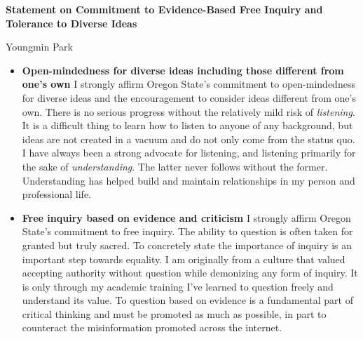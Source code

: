 \documentclass[a4paper,11pt]{article}
\begin{document}
	
	\begin{center}
		\Large \textbf{Statement on Commitment to Evidence-Based Free Inquiry and Tolerance to Diverse Ideas}
		
		\Large Youngmin Park
	\end{center}
	
	\begin{itemize}
		\item \textbf{Open-mindedness for diverse ideas including those different from one's own}
		I strongly affirm Oregon State's commitment to open-mindedness for diverse ideas and the encouragement to consider ideas different from one's own. There is no serious progress without the relatively mild risk of \textit{listening}. It is a difficult thing to learn how to listen to anyone of any background, but ideas are not created in a vacuum and do not only come from the status quo. I have always been a strong advocate for listening, and listening primarily for the sake of \textit{understanding}. The latter never follows without the former. Understanding has helped build and maintain relationships in my person and professional life.
		
		\item \textbf{Free inquiry based on evidence and criticism}
		I strongly affirm Oregon State's commitment to free inquiry. The ability to question is often taken for granted but truly sacred. To concretely state the importance of inquiry is an important step towards equality. I am originally from a culture that valued accepting authority without question while demonizing any form of inquiry. It is only through my academic training I've learned to question freely and understand its value. To question based on evidence is a fundamental part of critical thinking and must be promoted as much as possible, in part to counteract the misinformation promoted across the internet.
	\end{itemize}

	
\end{document}
